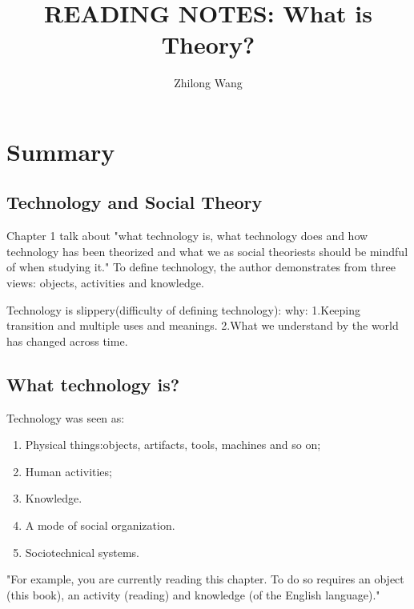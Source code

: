 \documentclass[18pt]{article}
\begin{document}
 
 
\title{READING NOTES: What is Theory?}
\author{Zhilong Wang}

\maketitle
\section{Summary}
\subsection{Technology and Social Theory}
Chapter 1 talk about "what technology is, what technology does and how technology has been theorized
and what we as social theoriests should be mindful of when studying it."\cite{textbook}
To define technology, the author demonstrates from three views: objects, activities and knowledge.

Technology is slippery(difficulty of defining technology):
why:
1.Keeping transition and multiple uses and meanings.
2.What we understand by the world has changed across time.

\subsection{What technology is?}
Technology was seen as:
\begin{enumerate}
    \item Physical things:objects, artifacts, tools, machines and so on;
    \item Human activities;
    \item Knowledge.
    \item A mode of social organization.
    \item Sociotechnical systems.
\end{enumerate}
"For example, you are currently reading this
chapter. To do so requires an object (this book), an activity (reading) and
knowledge (of the English language)."\cite{textbook}
\end{document}
